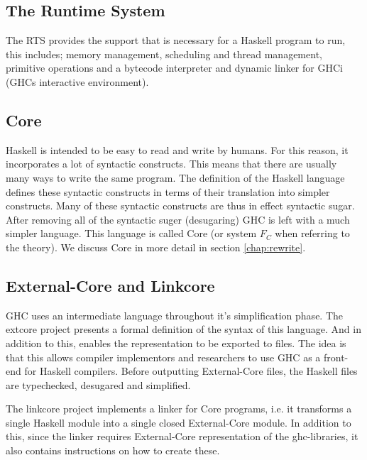 \subsection{The Runtime System}

The RTS provides the support that is necessary for a Haskell program to run, this
includes; memory management, scheduling and thread management, primitive operations
and a bytecode interpreter and dynamic linker for GHCi (GHCs interactive environment).
\cite{marlow2012glasgow} 

\subsection{Core}

Haskell is intended to be easy to read and write by humans. For this reason, it
incorporates a lot of syntactic constructs. This means that there are
usually many ways to write the same program. The definition of the Haskell language
defines these syntactic constructs in terms of their translation into simpler
constructs. Many of these syntactic constructs are thus in effect syntactic sugar.
After removing all of the syntactic suger (desugaring) GHC is left with a much 
simpler language. This language is called Core (or system $F_C$ when referring to
the theory).\cite{marlow2012glasgow} We discuss Core in more detail in section 
\ref{chap:rewrite}.

\subsection{External-Core and Linkcore}

GHC uses an intermediate language throughout it's 
simplification phase. The extcore project presents a formal definition of the syntax 
of this language. And in addition to this, enables the representation to be exported 
to files. The idea is that this allows compiler implementors and researchers to use GHC
as a front-end for Haskell compilers. Before outputting External-Core files,
the Haskell files are typechecked, desugared and simplified. \cite{tolmach2010ghc}

The linkcore project implements a linker for Core programs, i.e. it transforms
a single Haskell module into a single closed External-Core module. In addition to
this, since the linker requires External-Core representation of the ghc-libraries,
it also contains instructions on how to create these. 

